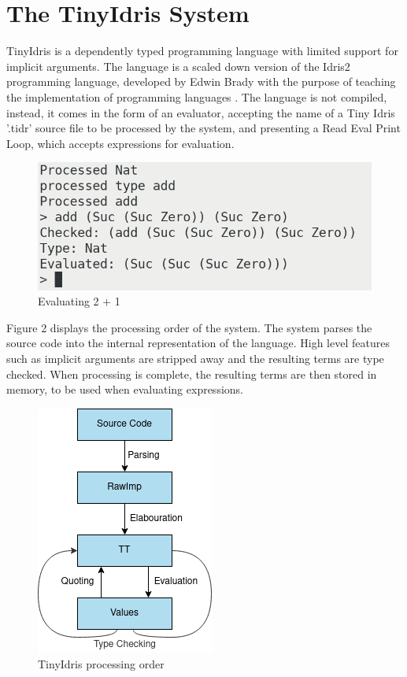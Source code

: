 \documentclass[a4paper]{article}
\begin{document}
\section{The TinyIdris System}
\label{sec:org2a24981}

TinyIdris is a dependently typed programming language with limited
support for implicit arguments. The language is a scaled down version
of the Idris2 programming language, developed by Edwin Brady with the
purpose of teaching the implementation of programming languages
\cite{Splv'202020Aug}. The language is not compiled, instead, it comes
in the form of an evaluator, accepting the name of a 
Tiny Idris '.tidr' source file to be processed by the system,
and presenting a Read Eval Print Loop, which accepts expressions for
evaluation.

\begin{center}
\begin{figure}[htbp]
\centering
\includegraphics[scale=0.35]{./Resource/addEval.png}
\caption{Evaluating 2 + 1}
\end{figure}
\end{center}

Figure 2 displays the processing order of the system.
The system parses the source code into the internal representation of
the language. High level features such as implicit arguments are
stripped away and the resulting terms are type checked. When processing
is complete, the resulting terms are then stored in memory, to be used
when evaluating expressions.

\begin{center}
\begin{figure}[htbp]
\centering
\includegraphics[scale=0.60]{./Resource/main.png}
\caption{TinyIdris processing order}
\end{figure}
\end{center}
\end{document}
